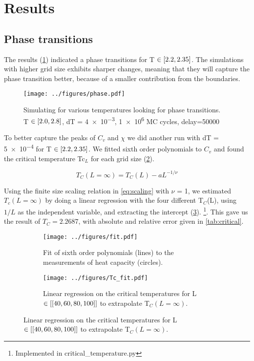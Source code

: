 \section{Results}

\subsection{Phase transitions}

The results (\cref{fig:phase}) indicated a phase transitions for T $\in
\left[2.2,2.35\right]$. The simulations with higher grid size exhibits sharper
changes, meaning that they will capture the phase transition better, because of
a smaller contribution from the boundaries.

\begin{figure}[ht]
  \centering
  \texttt{[image: ../figures/phase.pdf]}
  \caption{Simulating for various temperatures looking for phase transitions.\\
  T $\in \left[2.0,2.8\right]$, dT = \num{4e-3}, \num{1e6} MC cycles, delay=50000}
  \label{fig:phase}
\end{figure}


To better capture the peaks of $C_v$ and $\chi$ we did another
run with dT = \num{5e-4} for T $\in \left[2.2, 2.35\right]$.
 We fitted sixth order polynomials to $C_v$ and found
the critical temperature Tc$_{L}$ for each grid size (\ref{fig:polyfit}).


\begin{equation}
  \label{eq:scaling}
  T_C(L=\infty) = T_C(L) - aL^{-1/\nu}
\end{equation}

Using the finite size scaling relation in
\cref{eq:scaling} with $\nu$ = 1, we estimated $T_c(L=\infty)$
by doing a linear
regression with the four different T$_C$(L), using $1/L$ as the independent
variable, and extracting the intercept (\cref{fig:lin_reg}).
\footnote{Implemented in critical\_temperature.py}.  This gave us the result of $T_C=2.2687$, with absolute and relative error
 given in \cref{tab:critical}.




 \begin{figure}[ht]
   \begin{subfigure}[t]{.5\textwidth} %
     \centering
     \texttt{[image: ../figures/fit.pdf]}
     \caption{Fit of sixth order polynomials (lines) to the measurements
     of heat capacity (circles).}
     \label{fig:polyfit}
   \end{subfigure}
   \hfill
   \begin{subfigure}[t]{.5\textwidth}
     \centering
     \texttt{[image: ../figures/Tc\_fit.pdf]}
     \caption{Linear regression on the critical temperatures for L $\in \left[[40,60,80,100]\right]$
     to extrapolate T$_C(L=\infty)$.}
     \label{fig:lin_reg}
   \end{subfigure}
   \label{fig:test}
 \end{figure}




 \begin{table}[htp]
   \centering
   \caption{Results for T$_C(L=\infty)$.}
   \label{tab:critical}
 \end{table}
